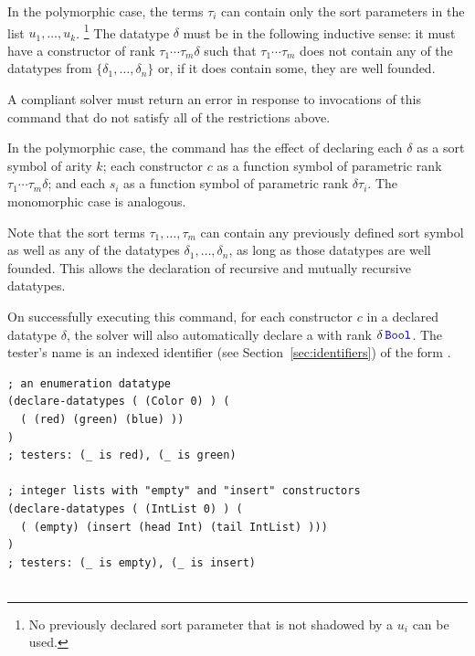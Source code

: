 \begin{description}
In the polymorphic case,
the terms $\tau_i$ can contain only the sort parameters in the list $u_1, \ldots, u_k$.%
\footnote{%
No previously declared sort parameter that is not shadowed by a $u_i$ can be used.
}
The datatype $\delta$ must be  in the following inductive sense:
it must have a constructor of rank $\tau_1\cdots\tau_m\delta$ 
such that $\tau_1\cdots\tau_m$ does not contain any of the datatypes 
from $\{\delta_1, \ldots, \delta_n\}$ or, if it does contain some, they are well founded.

A compliant solver must return an error in response to invocations of this command 
that do not satisfy all of the restrictions above.  

In the polymorphic case, 
the command has the effect of declaring each $\delta$ as a sort symbol of arity $k$;
each constructor $c$ as a function symbol of parametric rank $\tau_1\cdots\tau_m\delta$;
and each $s_i$ as a function symbol of parametric rank $\delta\tau_i$.
The monomorphic case is analogous.

Note that the sort terms $\tau_1, \ldots,\tau_m$ can contain any previously defined 
sort symbol as well as any of the datatypes $\delta_1, \ldots, \delta_n$,
as long as those datatypes are well founded.
This allows the declaration of recursive and mutually recursive datatypes.

On successfully executing this command, 
for each constructor $c$ in a declared datatype $\delta$, 
the solver will also automatically declare a 
with rank $\delta\,\ter{Bool}$.
The tester's name is an indexed identifier (see Section~\ref{sec:identifiers}) 
of the form .
\medskip

\begin{lstlisting}[linewidth=37em]
; an enumeration datatype
(declare-datatypes ( (Color 0) ) (
  ( (red) (green) (blue) ))
)
; testers: (_ is red), (_ is green)

; integer lists with "empty" and "insert" constructors
(declare-datatypes ( (IntList 0) ) (
  ( (empty) (insert (head Int) (tail IntList) )))
)
; testers: (_ is empty), (_ is insert)


\end{lstlisting}
\end{description}

